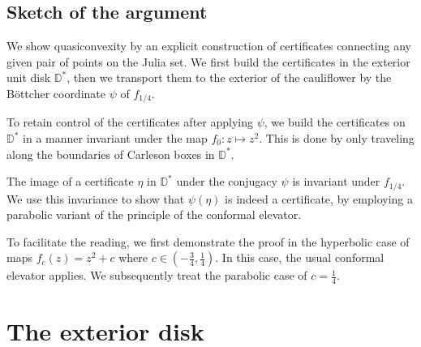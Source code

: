 \subsection{Sketch of the argument}

We show quasiconvexity by an explicit construction of certificates connecting any given pair of points on the Julia set.
We first build the certificates in the exterior unit disk $\mathbb D ^*$, then we transport them to the exterior of the cauliflower by the Böttcher coordinate $\psi$ of $f_{1/4}$.

To retain control of the certificates after applying $\psi$, we build the certificates on $\mathbb D^*$ in a manner invariant under the map $f_0: z\mapsto z^2$. This is done by only traveling along the boundaries of Carleson boxes in $\mathbb D^{*}$. 

The image of a certificate $\eta$ in $\mathbb D^{*}$ under the conjugacy $\psi$ is invariant under $f_{1/4}$. We use this invariance to show that $\psi(\eta)$ is indeed a certificate, by employing a parabolic variant of the principle of the conformal elevator.

To facilitate the reading, we first demonstrate the proof in the hyperbolic case of maps $f_c(z)=z^2+c$ where  $c\in\left(-\frac 34,\frac{1}{4}\right)$. In this case, the usual conformal elevator applies. We subsequently treat the parabolic case of $c=\frac 14$.



\section{The exterior disk}

\begin{comment}
The exterior $\D^{*}=\left\{ \left|z\right|>1\right\} $ of the unit
disk is trivially quasiconvex by connecting points along the perimeter of the circle. However, these paths follow the boundary closely and their length would blow up if we transport them to the exterior of $\mathcal{J}(f_{c})$, $c\neq0$, via the Riemann map. Instead,
\end{comment}

